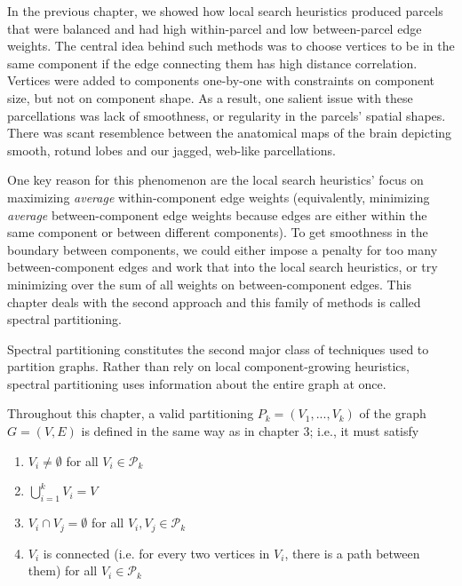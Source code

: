 
In the previous chapter, we showed how local search heuristics produced
parcels that were balanced and had high within-parcel and low
between-parcel edge weights. The central idea behind such methods
was to choose vertices to be in the same component if the edge
connecting them has high distance correlation. Vertices were added to
components one-by-one with constraints on component size, but not on
component shape. As a result, one salient issue with these
parcellations was lack of smoothness, or regularity in the parcels'
spatial shapes. There was scant resemblence between the anatomical maps
of the brain depicting smooth, rotund lobes and our jagged, web-like
parcellations.

One key reason for this phenomenon are the local search heuristics'
focus on maximizing \textit{average} within-component edge weights
(equivalently, minimizing \textit{average} between-component edge
weights because edges are either within the same component or between
different components). To get smoothness in the boundary between
components, we could either impose a penalty for too many
between-component edges and work that into the local search heuristics,
or try minimizing over the sum of all weights on between-component
edges. This chapter deals with the second approach and this family of
methods is called spectral partitioning.

Spectral partitioning constitutes the second major class of techniques
used to partition graphs. Rather than rely on local component-growing
heuristics, spectral partitioning uses information about the entire
graph at once.

Throughout this chapter, a valid partitioning
$P_k = (V_1, ..., V_k)$ of the graph $G = (V, E)$ is defined in the
same way as in chapter 3; i.e., it must satisfy

\begin{enumerate}[1.]
\item
$V_i \neq \emptyset$ for all $V_i \in \mathcal{P}_k$

\item
$\bigcup\limits_{i=1}^k V_i = V$

\item
$V_i \cap V_j = \emptyset$ for all $V_i, V_j \in \mathcal{P}_k$

\item
$V_i$ is connected (i.e. for every two vertices in $V_i$, there is a
path between them) for all $V_i \in \mathcal{P}_k$
\end{enumerate}

